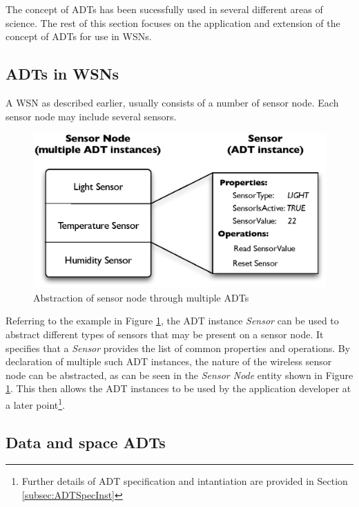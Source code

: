 The concept of ADTs has been sucessfully used in several different areas of
science. The rest of this section focuses on the application and
extension of the concept of ADTs for use in WSNs.

\subsection{ADTs in WSNs} \label{subsubsec:ADTsinWSN}

A WSN as described earlier, usually consists of a number of sensor node. Each
sensor node may include several sensors.

\begin{figure}
\centering
\includegraphics[scale=0.71]{img/ADTsMultipleInstances.eps}
\caption[Abstraction of sensor node through multiple ADTs]{Abstraction of sensor node through multiple ADTs}
\label{Fig:MultipleADTs}
\end{figure} 
  
Referring to the example in Figure \ref{Fig:MultipleADTs}, the ADT instance \emph{Sensor} can be used to abstract different types of sensors
that may be present on a sensor node. It specifies that a \emph{Sensor}
provides the list of common properties and operations. 
By declaration of multiple such ADT instances, the nature of the
wireless sensor node can be abstracted, as can be seen in the \emph{Sensor Node} entity shown in
Figure \ref{Fig:MultipleADTs}. This then allows the ADT instances to be used by the application
developer at a later point\footnote{Further details of ADT specification and
intantiation are provided in Section \ref{subsec:ADTSpecInst}}.

\subsection{Data and space ADTs} \label{subsubsec:DataAndSpaceADTs}

